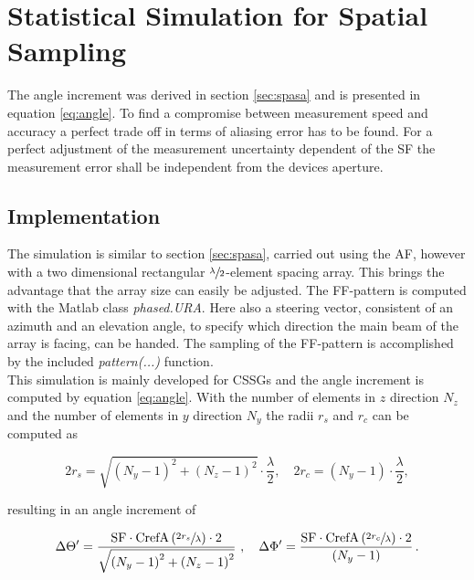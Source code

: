 \chapter{Statistical Simulation for Spatial Sampling}

The angle increment was derived in section \ref{sec:spasa} and is presented in equation \ref{eq:angle}. To find a compromise between measurement speed and accuracy a perfect trade off in terms of aliasing error has to be found. For a perfect adjustment of the measurement uncertainty dependent of the \ac{SF} the measurement error shall be independent from the devices aperture.

\section{Implementation}

The simulation is similar to section \ref{sec:spasa}, carried out using the \ac{AF}, however with a two dimensional rectangular $\sfrac{\lambda}{2}$-element spacing array. This brings the advantage that the array size can easily be adjusted. The \ac{FF}-pattern is computed with the Matlab\texttrademark{} class \textit{phased.URA}. Here also a steering vector, consistent of an azimuth and an elevation angle, to specify which direction the main beam of the array is facing, can be handed. The sampling of the \ac{FF}-pattern is accomplished by the included \textit{pattern(...)} function.\\
This simulation is mainly developed for \acp{CSSG} and the angle increment is computed by equation \ref{eq:angle}. With the number of elements in $z$ direction $N_z$ and the number of elements in $y$ direction $N_y$ the radii $r_s$ and $r_c$ can be computed as

\begin{equation}
2r_s = \sqrt{\left(N_y-1\right)^2+\left(N_z-1\right)^2}\cdot\frac{\lambda}{2},\quad 2r_c=\left(N_y-1\right)\cdot\frac{\lambda}{2},
\end{equation}

resulting in an angle increment of

\begin{equation}
\Delta\Theta^\prime = \frac{\text{SF}\cdot\text{CrefA}\left(\sfrac{2r_s}{\lambda}\right)\cdot 2}{\sqrt{\left(N_y-1\right)^2+\left(N_z-1\right)^2}}\ ,\quad\Delta\Phi^\prime = \frac{\text{SF}\cdot\text{CrefA}\left(\sfrac{2r_c}{\lambda}\right)\cdot 2}{\left(N_y-1\right)}\,.
\end{equation}

